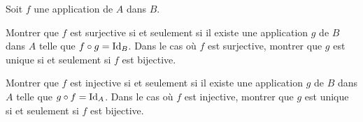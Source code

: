 \documentclass{magnolia}
\begin{document}
Soit $f$ une application de $A$ dans $B$.
\begin{questions}
\question
  \begin{questions}
  \question Montrer que $f$ est surjective si et seulement si il existe une
    application $g$ de $B$ dans $A$ telle que $f\circ g=\operatorname{Id}_{B}$.
  \question Dans le cas où $f$ est surjective, montrer que $g$ est unique si
    et seulement si $f$ est bijective.
  \end{questions}
\question
  \begin{questions}
  \question Montrer que $f$ est injective si et seulement si il existe une
    application $g$ de $B$ dans $A$ telle que $g\circ f=\operatorname{Id}_{A}$.
  \question Dans le cas où $f$ est injective, montrer que $g$ est unique si
    et seulement si $f$ est bijective.
\end{questions}
\end{questions}
\end{document}
